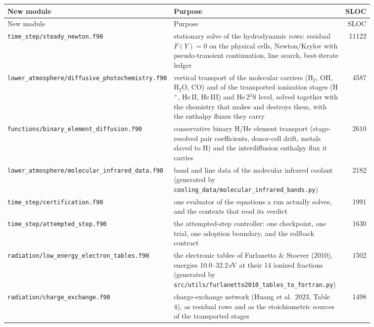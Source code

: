 {\footnotesize
\begin{longtable}{@{}>{\raggedright\arraybackslash}p{0.36\linewidth} >{\raggedright\arraybackslash}p{0.50\linewidth} r@{}}
\toprule
New module & Purpose & SLOC \\
\midrule
\endfirsthead
\toprule
New module & Purpose & SLOC \\
\midrule
\endhead
\texttt{time\_\allowbreak step/\allowbreak steady\_\allowbreak newton.f90} & stationary solve of the hydrodynamic rows: residual $F(Y)=0$ on the physical cells, Newton/Krylov with pseudo-transient continuation, line search, best-iterate ledger & 11122 \\
\texttt{lower\_\allowbreak atmosphere/\allowbreak diffusive\_\allowbreak photochemistry.f90} & vertical transport of the molecular carriers (H$_2$, OH, H$_2$O, CO) and of the transported ionization stages (H$^+$, He\,II, He\,III) and He\,2$^3$S level, solved together with the chemistry that makes and destroys them, with the enthalpy fluxes they carry & 4587 \\
\texttt{functions/\allowbreak binary\_\allowbreak element\_\allowbreak diffusion.f90} & conservative binary H/He element transport (stage-resolved pair coefficients, donor-cell drift, metals slaved to H) and the interdiffusion enthalpy flux it carries & 2610 \\
\texttt{lower\_\allowbreak atmosphere/\allowbreak molecular\_\allowbreak infrared\_\allowbreak data.f90} & band and line data of the molecular infrared coolant (generated by \texttt{cooling\_data/molecular\_infrared\_bands.py}) & 2182 \\
\texttt{time\_\allowbreak step/\allowbreak certification.f90} & one evaluator of the equations a run actually solves, and the contexts that read its verdict & 1991 \\
\texttt{time\_\allowbreak step/\allowbreak attempted\_\allowbreak step.f90} & the attempted-step controller: one checkpoint, one trial, one adoption boundary, and the rollback contract & 1630 \\
\texttt{radiation/\allowbreak low\_\allowbreak energy\_\allowbreak electron\_\allowbreak tables.f90} & the electronic tables of Furlanetto \& Stoever (2010), energies 10.0--32.2\,eV at their 14 ionized fractions (generated by \texttt{src/utils/furlanetto2010\_tables\_to\_fortran.py}) & 1502 \\
\texttt{radiation/\allowbreak charge\_\allowbreak exchange.f90} & charge-exchange network (Huang et al.\ 2023, Table 4), as residual rows and as the stoichiometric sources of the transported stages & 1498 \\

\end{longtable}}
